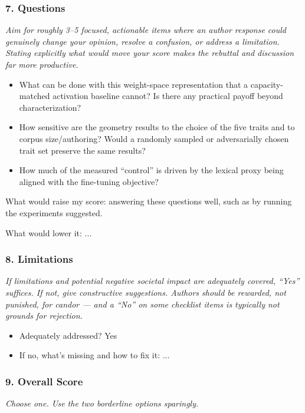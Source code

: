 \subsubsection*{7. Questions}
{\itshape Aim for roughly 3--5 focused, actionable items where an author
response could genuinely change your opinion, resolve a confusion, or address a
limitation. Stating explicitly what would move your score makes the rebuttal
and discussion far more productive.}

\begin{itemize}
  \item What can be done with this weight-space representation that a
  capacity-matched activation baseline cannot? Is there any practical payoff
  beyond characterization?
  \item How sensitive are the geometry results to the choice of the five traits
  and to corpus size/authoring? Would a randomly sampled or adversarially
  chosen trait set preserve the same results?
  \item How much of the measured ``control'' is driven by the lexical proxy
  being aligned with the fine-tuning objective?
\end{itemize}

What would raise my score: answering these questions well, such as by running
the experiments suggested.

What would lower it: ...

\subsubsection*{8. Limitations}
{\itshape If limitations and potential negative societal impact are adequately
covered, ``Yes'' suffices. If not, give constructive suggestions. Authors
should be rewarded, not punished, for candor --- and a ``No'' on some checklist
items is typically not grounds for rejection.}

\begin{itemize}
  \item Adequately addressed? Yes
  \item If no, what's missing and how to fix it: ...
\end{itemize}

\subsubsection*{9. Overall Score}
{\itshape Choose one. Use the two borderline options sparingly.}

